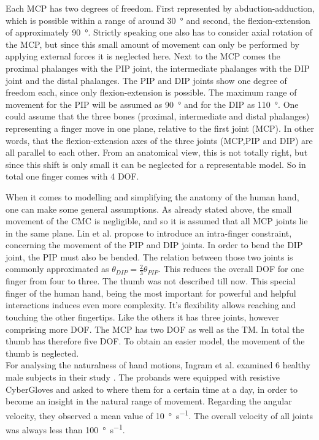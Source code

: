 Each \ac{MCP} has two degrees of freedom. First represented by abduction-adduction, which is possible within a range of around \SI{30}{\degree} and second, the flexion-extension of approximately \SI{90}{\degree}. Strictly speaking one also has to consider axial rotation of the MCP, but since this small amount of movement can only be performed by applying external forces it is neglected here. Next to the MCP comes the proximal phalanges with the \ac{PIP} joint, the intermediate phalanges with the \ac{DIP} joint and the distal phalanges. The \ac{PIP} and \ac{DIP} joints show one degree of freedom each, since only flexion-extension is possible. The maximum range of movement for the \ac{PIP} will be assumed as \SI{90}{\degree} and for the \ac{DIP} as \SI{110}{\degree}. One could assume that the three bones (proximal, intermediate and distal phalanges) representing a finger move in one plane, relative to the first joint (\ac{MCP}). In other words, that the flexion-extension axes of the three joints (\ac{MCP},\ac{PIP} and \ac{DIP}) are all parallel to each other. From an anatomical view, this is not totally right, but since this shift is only small it can be neglected for a representable model. So in total one finger comes with 4 \ac{DOF}. 

When it comes to modelling and simplifying the anatomy of the human hand, one can make some general assumptions. As already stated above, the small movement of the \ac{CMC} is negligible, and so it is assumed that all \ac{MCP} joints lie in the same plane. Lin et al. propose to introduce an intra-finger constraint, concerning the movement of the \ac{PIP} and \ac{DIP} joints. In order to bend the \ac{DIP} joint, the \ac{PIP} must also be bended. The relation between those two joints is commonly approximated as $ \theta_{DIP} = \frac{2}{3} \theta_{PIP} $. This reduces the overall \ac{DOF} for one finger from four to three. The thumb was not described till now. This special finger of the human hand, being the most important for powerful and helpful interactions induces even more complexity. It's flexibility allows reaching and touching the other fingertips. Like the others it has three joints, however comprising more \ac{DOF}. The \ac{MCP} has two \ac{DOF} as well as the \ac{TM}. In total the thumb has therefore five \ac{DOF}. To obtain an easier model, the movement of the thumb is neglected.\\
For analysing the naturalness of hand motions, Ingram et al. examined 6 healthy male subjects in their study \cite{ingram2008statistics}. The probands were equipped with resistive CyberGloves and asked to where them for a certain time at a day, in order to become an insight in the natural range of movement. Regarding the angular velocity, they observed a mean value of \SI[per-mode=symbol]{10}{\degree \per \second}. The overall velocity of all joints was always less than \SI[per-mode=symbol]{100}{\degree \per \second}.


